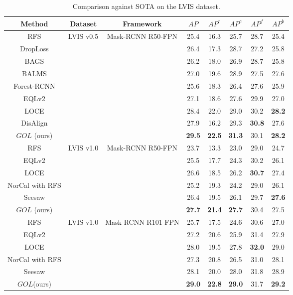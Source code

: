\documentclass[runningheads]{llncs}
\begin{document}
\begin{table*}
    \centering
        \caption{Comparison against SOTA on the LVIS dataset.}
        \begin{tabular}{c|c|c|ccccc}
        Method&Dataset&Framework &$AP$&$AP^r$&$AP^c$&$AP^f$&$AP^b$ \\
         \hline
        RFS \cite{gupta2019lvis}&\multirow{ 9}{*}{LVIS v0.5}&\multirow{ 9}{*}{Mask-RCNN R50-FPN}&25.4&16.3&25.7&28.7&25.4 \\
        DropLoss\cite{hsieh2021droploss}&&&26.4&17.3&28.7&27.2&25.8 \\
        BAGS \cite{li2020overcoming}& & &26.2&18.0&26.9&28.7&25.8 \\
        BALMS\cite{Ren2020balms}& & &27.0&19.6&28.9&27.5&27.6\\
        Forest-RCNN\cite{wu2020forest}& & &25.6&18.3&26.4&27.6&25.9 \\
        EQLv2\cite{tan2021equalization}& & &27.1&18.6&27.6&29.9&27.0\\
        LOCE\cite{feng2021exploring}& & &28.4 &22.0&29.0&30.2&\textbf{28.2}\\
        DisAlign \cite{zhang2021distribution}& & &27.9 &16.2&29.3&\textbf{30.8}&27.6\\
        $GOL$ (ours) & & &\textbf{29.5} &\textbf{22.5}&\textbf{31.3}&30.1&\textbf{28.2}\\
        \hline
        RFS\cite{gupta2019lvis}&\multirow{6}{*}{LVIS v1.0}&\multirow{6}{*}{Mask-RCNN R50-FPN}&23.7&13.3&23.0&29.0&24.7\\
         EQLv2\cite{tan2021equalization}&&&25.5&17.7&24.3&30.2&26.1\\
          LOCE\cite{feng2021exploring}& & &26.6 &18.5 &26.2&\textbf{30.7}&27.4\\
         NorCal with RFS \cite{pan2021model}&&&25.2&19.3&24.2&29.0&26.1\\
         Seesaw\cite{wang2021seesaw}&&&26.4 &19.5&26.1&29.7&\textbf{27.6}\\
         $GOL$ (ours)&& &\textbf{27.7}&\textbf{21.4}&\textbf{27.7}&30.4&27.5\\
         \hline
         RFS \cite{gupta2019lvis}&\multirow{6}{*}{LVIS v1.0}&\multirow{6}{*}{Mask-RCNN R101-FPN}&25.7&17.5&24.6&30.6&27.0\\
         EQLv2\cite{tan2021equalization}&&&27.2&20.6&25.9&31.4&27.9\\

         LOCE\cite{feng2021exploring}&&&28.0 &19.5 &27.8&\textbf{32.0}&29.0\\
         NorCal with RFS \cite{pan2021model}&&&27.3&20.8&26.5&31.0&28.1\\
         Seesaw\cite{wang2021seesaw}&&&28.1&20.0&28.0&31.8&28.9\\
         $GOL$(ours)&&&\textbf{29.0}&\textbf{22.8}&\textbf{29.0}&31.7&\textbf{29.2}\\
    \end{tabular}
    \label{tab:sota}
\end{table*}
\end{document}
